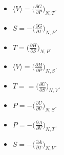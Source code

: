 	\begin{multicols}{2}
		\begin{itemize}
			\item $\langle V\rangle = \biggl(\frac{\partial G}{\partial P}\biggr)_{N, T}$.
			\item $S = -\biggl(\frac{\partial G}{\partial T}\biggr)_{N, P}$.
		\end{itemize}
	\end{multicols}

	\begin{multicols}{2}
		\begin{itemize}
			\item $T = \biggl(\frac{\partial H}{\partial S}\biggr)_{N, P}$.
			\item $\langle V\rangle = \biggl(\frac{\partial H}{\partial P}\biggr)_{N, S}$.
		\end{itemize}
	\end{multicols}

	\begin{multicols}{2}
		\begin{itemize}
			\item $T = =\biggl(\frac{\partial U}{\partial S}\biggr)_{N, V}$.
			\item $P = - \biggl(\frac{\partial U}{\partial V}\biggr)_{N, S}$.
		\end{itemize}
	\end{multicols}

	\begin{multicols}{2}
		\begin{itemize}
			\item $P = -\biggl(\frac{\partial A}{\partial V}\biggr)_{N, T}$.
			\item $S = - \biggl(\frac{\partial A}{\partial T}\biggr)_{N, V}$.
		\end{itemize}
	\end{multicols}


